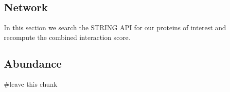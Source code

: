 \documentclass[
]{article}
\newenvironment{Shaded}{\begin{snugshade}}{\end{snugshade}}
\newcommand{\CommentTok}[1]{\textcolor[rgb]{0.50,0.62,0.50}{#1}}
\let\oldShaded\Shaded
\let\endoldShaded\endShaded
\renewenvironment{Shaded}{\scriptsize\oldShaded}{\endoldShaded}
\begin{document}
\hypertarget{network-1}{%
\subsection{Network}\label{network-1}}

In this section we search the STRING API for our proteins of interest
and recompute the combined interaction score.


\hypertarget{abundance}{%
\subsection{Abundance}\label{abundance}}

\begin{Shaded}
\begin{Highlighting}[]
\CommentTok{#leave this chunk}
\end{Highlighting}
\end{Shaded}
\end{document}

